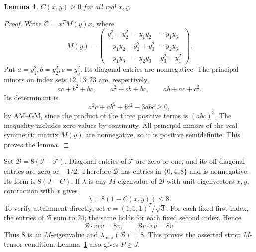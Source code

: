 \documentclass[11pt]{article}
\newtheorem{lemma}{Lemma}
\newcommand{\I}{\mathcal I}
\newcommand{\T}{\mathcal T}
\newcommand{\B}{\mathcal B}
\begin{document}
\begin{lemma}\label{lem:psd}
$C(x,y)\ge0$ for all real $x,y$.
\end{lemma}
\begin{proof}
Write $C=x^TM(y)x$, where
\[
 M(y)=\begin{pmatrix}
 y_1^2+y_2^2&-y_1y_2&-y_1y_3\\
 -y_1y_2&y_2^2+y_3^2&-y_2y_3\\
 -y_1y_3&-y_2y_3&y_3^2+y_1^2
 \end{pmatrix}.
\]
Put $a=y_1^2,b=y_2^2,c=y_3^2$. Its diagonal entries are
nonnegative. The principal minors on index sets $12,13,23$ are,
respectively,
\[
 ac+b^2+bc,\qquad a^2+ab+bc,\qquad ab+ac+c^2.
\]
Its determinant is
\[
                a^2c+ab^2+bc^2-3abc\ge0,
\]
by AM--GM, since the product of the three positive terms is
$(abc)^3$. The inequality includes zero values by continuity.
All principal minors of the real symmetric matrix $M(y)$ are
nonnegative, so it is positive semidefinite. This proves the lemma.
\end{proof}

Set $\B=8(\I-\T)$. Diagonal entries of $\T$ are zero or one,
and its off-diagonal entries are zero or $-1/2$.
Therefore $\B$ has entries in $\{0,4,8\}$ and is nonnegative.
Its form is $8(J-C)$. If $\lambda$ is any $M$-eigenvalue of
$\B$ with unit eigenvectors $x,y$, contraction with $x$ gives
\[
              \lambda=8(1-C(x,y))\le8.
\]
To verify attainment directly, set $v=(1,1,1)^T/\sqrt3$.
For each fixed first index, the entries of $\B$ sum to $24$;
the same holds for each fixed second index. Hence
\[
       \B\mathbin{\cdot}vvv=8v,\qquad
       \B v\mathbin{\cdot}vv=8v.
\]
Thus $8$ is an $M$-eigenvalue and $\lambda_{\max}(\B)=8$.
This proves the asserted strict $M$-tensor condition.
Lemma~\ref{lem:psd} also gives $P\ge J$.
\end{document}

